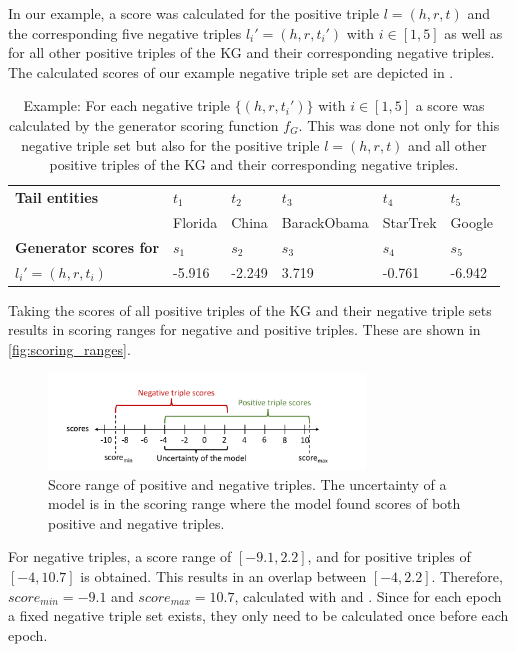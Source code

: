 In our example, a score was calculated for the positive triple $l = (h,r,t)$ and the corresponding five negative triples $l_i' = (h,r,t_i')$  with $i \in [1,5]$ as well as for all other positive triples of the \ac{KG} and their corresponding negative triples.
The calculated scores of our example negative triple set are depicted in .
\begin{table}[h]
    \centering
    \begin{tabular}{llllll}
        \toprule
        
        \textbf{Tail entities}
        & \textbf{$t_1$} & \textbf{$t_2$} & \textbf{$t_3$} & \textbf{$t_4$} & \textbf{$t_5$} \\
         
        & Florida
        & China
        & BarackObama
        & StarTrek
        & Google  \\

        \midrule
        
        \textbf{Generator scores for}
        & $s_1$ & $s_2$ & $s_3$ & $s_4$ & $s_5$ \\
       
        
        \textbf{$l_i' = (h, r, t_i)$}
        & -5.916 
        & -2.249  
        & 3.719 
        & -0.761 
        & -6.942\\ 
        
        \bottomrule
        
    \end{tabular}
    \caption{Example: For each negative triple
    $\{(h,r,t_i')\}$ with $i \in [1,5]$ a score was calculated by the generator scoring function $f_G$.
    This was done not only for this negative triple set but also for the positive triple $l = (h,r,t)$ and all other positive triples of the KG and their corresponding negative triples.}
\label{tab:generator_scores_of_neg}
\end{table}
Taking the scores of all positive triples of the \ac{KG} and their negative triple sets results in scoring ranges for negative and positive triples.
These are shown in \autoref{fig:scoring_ranges}.
\clearpage
\begin{figure}[H]
  \centering
    \includegraphics[width=0.75\textwidth]{figures/scoremin_scoremax_example.pdf}
  \caption{Score range of positive and negative triples.
  The uncertainty of a model is in the scoring range where the model found scores of both positive and negative triples.}
  \label{fig:scoring_ranges}
\end{figure}
For negative triples, a score range of $[-9.1, 2.2]$, and for positive triples of $[-4, 10.7]$ is obtained.
This results in an overlap between $[-4, 2.2]$.
Therefore, $score_{min} = -9.1$ and $score_{max} = 10.7$, calculated with   and .
Since for each epoch a fixed negative triple set exists, they only need to be calculated once before each epoch.